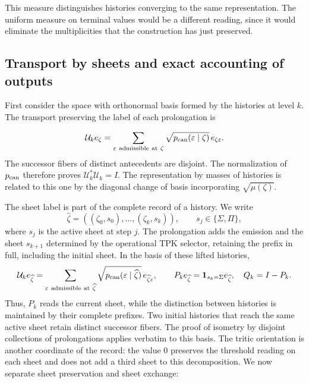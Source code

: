 This measure distinguishes histories converging to the same representation. The uniform measure on terminal values would be a different reading, since it would eliminate the multiplicities that the construction has just preserved.



\subsection{Transport by sheets and exact accounting of outputs}
First consider the space with orthonormal basis formed by the histories at level \(k\). The transport preserving the label of each prolongation is

\[
\mathcal U_ke_\zeta=
\sum_{\varepsilon\ \mathrm{admissible\ at}\ \zeta}
\sqrt{p_{\rm can}(\varepsilon\mid\zeta)}\,e_{\zeta\varepsilon}.
\]
The successor fibers of distinct antecedents are disjoint. The normalization of \(p_{\rm can}\) therefore proves \(\mathcal U_k^*\mathcal U_k=I\). The representation by masses of histories is related to this one by the diagonal change of basis incorporating \(\sqrt{\mu(\zeta)}\).

The sheet label is part of the complete record of a history. We write
\[
\widehat\zeta=((\zeta_0,s_0),\ldots,(\zeta_k,s_k)),\qquad
s_j\in\{\Sigma,\Pi\},
\]
where \(s_j\) is the active sheet at step \(j\). The prolongation adds the emission and the sheet \(s_{k+1}\) determined by the operational TPK selector, retaining the prefix in full, including the initial sheet. In the basis of these lifted histories,
\[
\mathcal U_ke_{\widehat\zeta}
=\sum_{\varepsilon\ \mathrm{admissible\ at}\ \widehat\zeta}
\sqrt{p_{\rm can}(\varepsilon\mid\widehat\zeta)}\,e_{\widehat\zeta\varepsilon},
\qquad
P_ke_{\widehat\zeta}=\mathbf1_{s_k=\Sigma}e_{\widehat\zeta},\quad
Q_k=I-P_k.
\]
Thus, \(P_k\) reads the current sheet, while the distinction between histories is maintained by their complete prefixes. Two initial histories that reach the same active sheet retain distinct successor fibers. The proof of isometry by disjoint collections of prolongations applies verbatim to this basis.
The tritic orientation is another coordinate of the record: the value \(0\) preserves the threshold reading on each sheet and does not add a third sheet to this decomposition. We now separate sheet preservation and sheet exchange:

